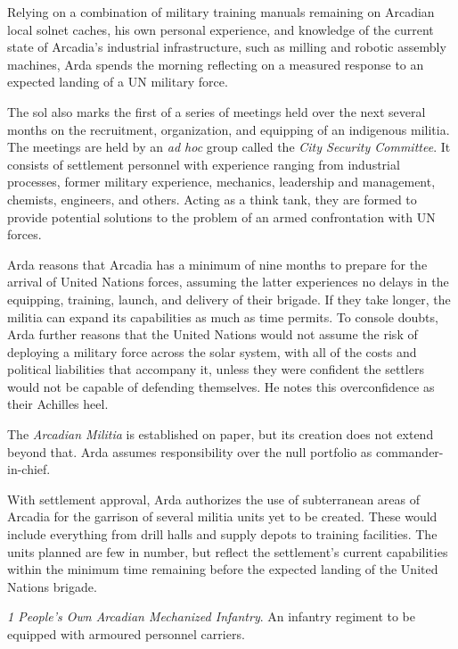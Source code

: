 Relying on a combination of military training manuals remaining on Arcadian local solnet caches, his own personal experience, and knowledge of the current state of Arcadia's industrial infrastructure, such as milling and robotic assembly machines, Arda spends the morning reflecting on a measured response to an expected landing of a UN military force. 

The sol also marks the first of a series of meetings held over the next several months on the recruitment, organization, and equipping of an indigenous militia. The meetings are held by an {\it ad hoc} group called the {\it City Security Committee}. It consists of settlement personnel with experience ranging from industrial processes, former military experience, mechanics, leadership and management, chemists, engineers, and others. Acting as a think tank, they are formed to provide potential solutions to the problem of an armed confrontation with UN forces.

Arda reasons that Arcadia has a minimum of nine months to prepare for the arrival of United Nations forces, assuming the latter experiences no delays in the equipping, training, launch, and delivery of their brigade. If they take longer, the militia can expand its capabilities as much as time permits. To console doubts, Arda further reasons that the United Nations would not assume the risk of deploying a military force across the solar system, with all of the costs and political liabilities that accompany it, unless they were confident the settlers would not be capable of defending themselves. He notes this overconfidence as their Achilles heel.

The {\it Arcadian Militia} is established on paper, but its creation does not extend beyond that. Arda assumes responsibility over the null portfolio as commander-in-chief.
\StopTimelineDate

With settlement approval, Arda authorizes the use of subterranean areas of Arcadia for the garrison of several militia units yet to be created. These would include everything from drill halls and supply depots to training facilities. The units planned are few in number, but reflect the settlement's current capabilities within the minimum time remaining before the expected landing of the United Nations brigade.

\startitemize[4]
\item {\it 1 People's Own Arcadian Mechanized Infantry}. An infantry regiment to be equipped with armoured personnel carriers.

